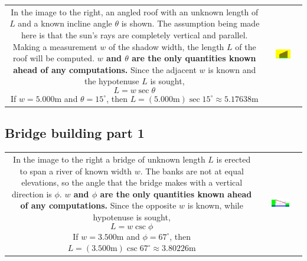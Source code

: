 \documentclass{article}
\begin{document}
\begin{tabular}{cc}
\parbox{0.5\textwidth}{
In the image to the right, an angled roof with an unknown length of \(L\) and a known incline angle \(\theta\) is shown. The assumption being made here is that the sun's rays are completely vertical and parallel. Making a measurement \(w\) of the shadow width, the length \(L\) of the roof will be computed. {\bf \(w\) and \(\theta\) are the only quantities known ahead of any computations.} Since the adjacent \(w\) is known and the hypotenuse \(L\) is sought, 
\[L = w\sec\theta\] 
If \(w = 5.000\text{m}\) and \(\theta = 15^\circ\), then \\ \(L = (5.000\text{m})\sec 15^\circ \approx 5.17638\text{m}\)
} & \parbox{0.5\textwidth}{
\includegraphics[width = 0.5\textwidth]{angled_roof_2}
}
\end{tabular}




\subsection*{Bridge building part 1}
\begin{tabular}{cc}
\parbox{0.5\textwidth}{
In the image to the right a bridge of unknown length \(L\) is erected to span a river of known width \(w\). The banks are not at equal elevations, so the angle that the bridge makes with a vertical direction is \(\phi\). {\bf \(w\) and \(\phi\) are the only quantities known ahead of any computations.} Since the opposite \(w\) is known, while hypotenuse is sought, 
\[L = w\csc\phi\] 
If \(w = 3.500\text{m}\) and \(\phi = 67^\circ\), then \\ \(L = (3.500\text{m})\csc 67^\circ \approx 3.80226\text{m}\)
} & \parbox{0.5\textwidth}{
\includegraphics[width = 0.5\textwidth]{bridge_building}
}
\end{tabular}
\end{document}
